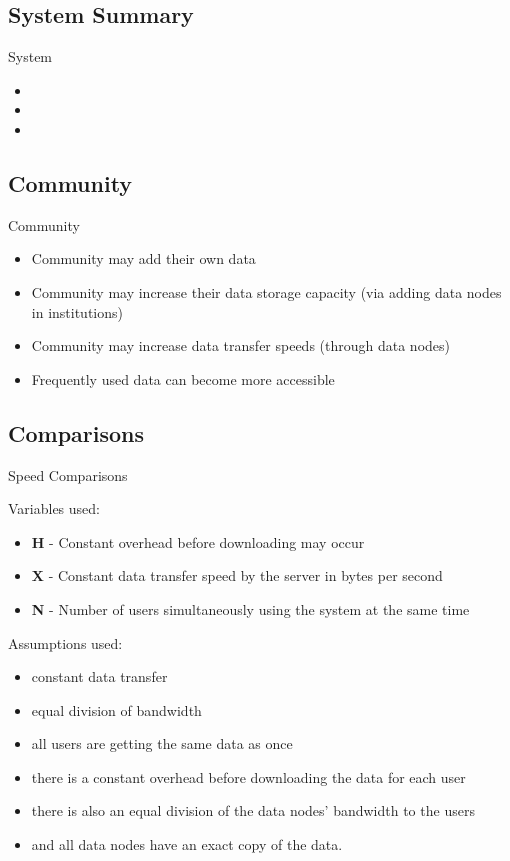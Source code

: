 \documentclass{beamer}
\begin{document}
\subsection{System Summary}
\begin{frame}{System}
  \begin{itemize}   
    \item 
    \item 
    \item 
  \end{itemize}
\end{frame}


\subsection{Community}
\begin{frame}{Community}
  \begin{itemize}   
    \item Community may add their own data
    \item Community may increase their data storage capacity (via adding data nodes in institutions)
    \item Community may increase data transfer speeds (through data nodes)
    \item Frequently used data can become more accessible
  \end{itemize}
\end{frame}

\subsection{Comparisons}
\begin{frame}{Speed Comparisons}

Variables used:
  \begin{itemize}   
    \item \textbf{H} - Constant overhead before downloading may occur
    \item \textbf{X} - Constant data transfer speed by the server in bytes per second
    \item \textbf{N} - Number of users simultaneously using the system at the same time
  \end{itemize}
  
Assumptions used:
\begin{itemize}
    \item constant data transfer
    \item equal division of bandwidth
    \item all users are getting the same data as once
    \item there is a constant overhead before downloading the data for each user
    \item there is also an equal division of the data nodes' bandwidth to the users
    \item and all data nodes have an exact copy of the data.
\end{itemize}
    
\end{frame}
\end{document}
